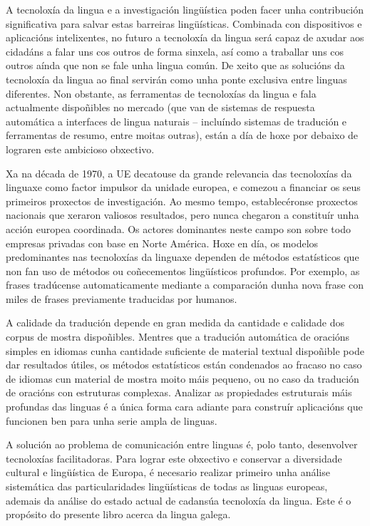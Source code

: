 \begin{multicols}{2}
A tecnoloxía da lingua e a investigación lingüística poden facer unha contribución significativa para salvar estas barreiras lingüísticas. Combinada con dispositivos e aplicacións intelixentes, no futuro a tecnoloxía da lingua será capaz de axudar aos cidadáns a falar uns cos outros de forma sinxela, así como a traballar uns cos outros aínda que non se fale  unha lingua común. De xeito que as solucións da tecnoloxía da lingua ao final servirán como unha ponte exclusiva entre linguas diferentes. Non obstante, as ferramentas de tecnoloxías da lingua e fala actualmente dispoñibles no mercado (que van de sistemas de respuesta automática  a interfaces de lingua naturais -- incluíndo sistemas de tradución e ferramentas de resumo, entre moitas outras), están a día de hoxe por debaixo de  lograren este ambicioso obxectivo.

Xa na década de 1970, a UE decatouse da grande relevancia das tecnoloxías da linguaxe como factor impulsor da unidade europea, e comezou a financiar os seus primeiros proxectos de investigación. Ao mesmo tempo, establecéronse proxectos nacionais que xeraron valiosos resultados, pero nunca chegaron a constituír unha acción europea coordinada. Os actores dominantes neste campo son sobre todo empresas privadas con base en Norte América. Hoxe en día, os modelos predominantes nas tecnoloxías da linguaxe dependen de métodos estatísticos que non fan uso de métodos ou coñecementos lingüísticos profundos. Por exemplo, as frases tradúcense automaticamente mediante a comparación dunha nova frase con miles de frases previamente traducidas por humanos.


A calidade da tradución depende en gran medida da cantidade e calidade dos corpus de mostra dispoñibles. Mentres que a tradución automática de oracións simples en idiomas cunha cantidade suficiente de material textual dispoñible pode dar resultados útiles, os métodos estatísticos están condenados ao fracaso no caso de idiomas cun material de mostra moito máis pequeno, ou no caso da tradución de oracións con estruturas complexas. Analizar as propiedades estruturais máis profundas das linguas é a única forma cara adiante para construír aplicacións que funcionen ben para unha serie ampla de linguas.

A solución ao problema de comunicación entre linguas é, polo tanto, desenvolver tecnoloxías facilitadoras. Para lograr este obxectivo e conservar a diversidade cultural e lingüística de Europa, é necesario realizar primeiro unha análise sistemática das particularidades lingüísticas de todas as linguas europeas, ademais da análise do estado actual de cadansúa tecnoloxía da lingua. Este é o propósito do presente libro acerca da lingua galega.


\end{multicols}
